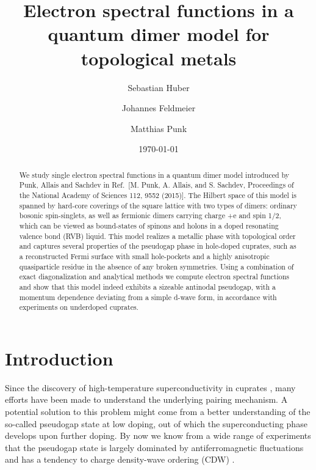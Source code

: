 \documentclass[aps,pra,reprint,showpacs,superscriptaddress]{revtex4-1}
\begin{document}
\title{Electron spectral functions in a quantum dimer model for topological metals}
\author{Sebastian Huber}
\author{Johannes Feldmeier}
\author{Matthias Punk}
\date{\today}

\begin{abstract}
We study single electron spectral functions in a quantum dimer model introduced by Punk, Allais and Sachdev in Ref.~[M. Punk, A. Allais, and S. Sachdev, Proceedings of the National Academy of Sciences 112, 9552 (2015)]. The Hilbert space of this model is spanned by hard-core coverings of the square lattice with two types of dimers: ordinary bosonic spin-singlets, as well as fermionic dimers carrying charge +e and spin 1/2, which can be viewed as bound-states of spinons and holons in a doped resonating valence bond (RVB) liquid. This model realizes a metallic phase with topological order and captures several properties of the pseudogap phase in hole-doped cuprates, such as a reconstructed Fermi surface with small hole-pockets and a highly anisotropic quasiparticle residue in the absence of any broken symmetries.
Using a combination of exact diagonalization and analytical methods we compute electron spectral functions and show that this model indeed exhibits a sizeable antinodal pseudogap, with a momentum dependence deviating from a simple d-wave form, in accordance with experiments on underdoped cuprates.
\end{abstract}

\maketitle

\section{Introduction}\label{Intro}


Since the discovery of high-temperature superconductivity in cuprates \cite{bednorz1986possible}, many efforts have been made to understand the underlying pairing mechanism. A potential solution to this problem might come from a better understanding of the so-called pseudogap state at low doping, out of which the superconducting phase develops upon further doping.  By now we know from a wide range of experiments that the pseudogap state is largely dominated by antiferromagnetic fluctuations \cite{niedermayer1998common,kastner1998magnetic,tallon2001doping,chan2016commensurate} and has a tendency to charge density-wave ordering (CDW) \cite{wu2011magnetic,ghiringhelli2012long,chang2012direct,blanco2013momentum,comin2014symmetry}.
\end{document}
